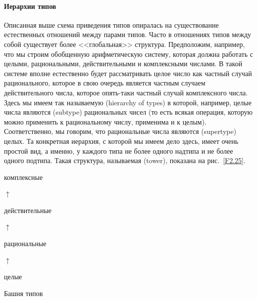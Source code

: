 \paragraph{Иерархии типов}


Описанная выше схема приведения типов опиралась на
существование естественных отношений между парами типов.  Часто в
отношениях типов между собой существует более <<глобальная>> структура.
Предположим, например, что мы строим обобщенную арифметическую
систему, которая должна работать с целыми, рациональными,
действительными и комплексными числами.  В такой системе вполне
естественно будет рассматривать целое число как частный случай
рационального, которое в свою очередь является частным случаем
действительного числа, которое опять-таки частный случай комплексного
числа.  Здесь мы имеем так называемую 
 (hierarchy of types) в которой,
например, целые числа являются  (subtype)
рациональных чисел (то есть всякая операция, которую можно применить к
рациональному числу, применима и к целым).  Соответственно, мы
говорим, что рациональные числа являются  
 (supertype) целых.  Та конкретная иерархия, с
которой мы имеем дело здесь, имеет очень простой вид, а именно, у
каждого типа не более одного надтипа и не более одного подтипа.  Такая
структура, называемая  (tower), показана на рис.~\ref{F2.25}.


\begin{cntrfig}
\begin{center}
комплексные

{\Huge $\uparrow$}

действительные

{\Huge $\uparrow$}

рациональные

{\Huge $\uparrow$}

целые
\end{center}
\caption{Башня типов 
}
\label{F2.25}

\end{cntrfig}

